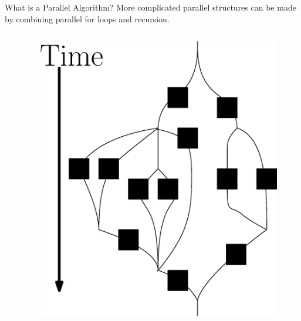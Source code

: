 \documentclass[xcolor=x11names, svgnames, rgb]{beamer}
\begin{document}
\begin{frame}[t]{What is a Parallel Algorithm?}
	More complicated parallel structures can be made by combining parallel for loops and recursion.
	\begin{columns}[T] %
	\begin{column}{.45\textwidth}
	\end{column}
	\hfill
	\begin{column}{.60\textwidth}
		\begin{figure}
			\includegraphics[width=0.8\linewidth]{imgs/altParallelForLoopComposition.eps}
		\end{figure}
	\end{column}
	\end{columns}
\end{frame}
\end{document}
